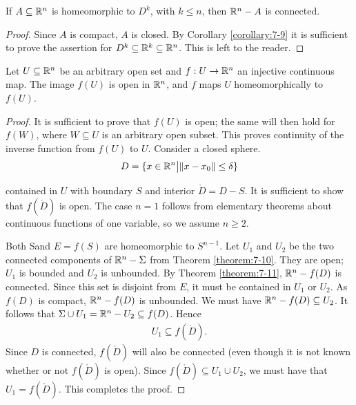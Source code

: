 \begin{theorem}\label{theorem:7-11}
  If $A\subseteq\mathbb{R}^n$ is homeomorphic to $D^k$, with $k\le n $, then $\mathbb{R}^n-A$ is connected.
\end{theorem}

\begin{proof}
  Since $A$ is compact, $A$ is closed. By Corollary \ref{corollary:7-9} it is sufficient to prove
the assertion for $D^k\subseteq\mathbb{R}^k\subseteq\mathbb{R}^n$. This is left to the reader.
\end{proof}

\begin{theorem}[Brouwer]\label{theorem:7-12}
  Let $U\subseteq \mathbb{R}^n$ be an arbitrary open set and $f:U\to\mathbb{R}^n$
an injective continuous map. The image $f(U)$ is open in $\mathbb{R}^n$, and $f$ maps $U$
homeomorphically to $f(U)$.
\end{theorem}

\begin{proof}
  It is sufficient to prove that $f(U)$ is open; the same will then hold for
$f(W)$, where $W\subseteq U$ is an arbitrary open subset. This proves continuity of the
inverse function from $f(U)$ to $U$. Consider a closed sphere.
\begin{align*}
  D = \{x\in\mathbb{R}^n \big| \|x-x_0\|\le \delta\}
\end{align*}

contained in $U$ with boundary $S$ and interior $\mathring{D}= D - S$. It is sufficient to show
that $f(\mathring{D})$ is open. The case $n = 1$ follows from elementary theorems about
continuous functions of one variable, so we assume $n\ge 2$.

Both Sand $E = f(S)$ are homeomorphic to $S^{n-1}$. Let $U_1$ and $U_2$ be the two
connected components of $\mathbb{R}^n-\Sigma$ from Theorem \ref{theorem:7-10}. They are open; $U_1$ is
bounded and $U_2$ is unbounded. By Theorem \ref{theorem:7-11}, $\mathbb{R}^n - f(D)$ is connected.
Since this set is disjoint from $E$, it must be contained in $U_1$ or $U_2$. As $f(D)$ is
compact, $\mathbb{R}^n - f(D)$ is unbounded. We must have $\mathbb{R}^n - f(D)\subseteq U_2$. It follows
that $\Sigma\cup U_1 = \mathbb{R}^n-U_2 \subseteq f(D)$. Hence
\begin{align*}
  U_1 \subseteq f(\mathring{D}).
\end{align*}
Since $D$ is connected, $f(\mathring{D})$ will also be connected (even though it is not known
whether or not $f(\mathring{D})$ is open). Since $f(\mathring{D})\subseteq U_1\cup U_2$, we must 
have that $U_1 = f(\mathring{D})$. This completes the proof.
\end{proof}

